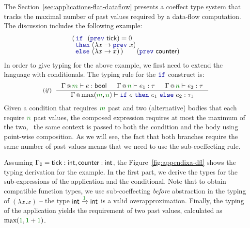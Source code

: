 The Section~\ref{sec:applications-flat-dataflow} presents a coeffect type system that tracks the 
maximal number of past values required by a data-flow computation. The discussion includes the 
following example:
%
\begin{equation*}
\begin{array}{l}
(\,   \kvd{if}~~(\kvd{prev}~\ident{tick})=0\\[-0.25em]
\,\,\, \kvd{then}~(\lambda x \rightarrow \kvd{prev}~x)\\[-0.25em]
\,\,\, \kvd{else}~(\lambda x \rightarrow x) \,)\qquad(\kvd{prev}~\ident{counter})
\end{array}
\end{equation*}
%
In order to give typing for the above example, we first need to extend the language with 
conditionals. The typing rule for the $\kvd{if}$ construct is:
%
\begin{equation*}
\tyrule{if}
  { \coctx{\Gamma}{\cclrd{m}} \vdash e : \ident{bool} &
    \coctx{\Gamma}{\cclrd{n}} \vdash e_1 : \tau &
    \coctx{\Gamma}{\cclrd{n}} \vdash e_2 : \tau }
  {\coctx{\Gamma}{\textnormal{max}(\cclrd{m},\cclrd{n})} \vdash \kvd{if}~e~\kvd{then}~e_1~\kvd{else}~e_2 : \tau_1 }
\end{equation*}
%
Given a condition that requires $\cclrd{m}$ past and two (alternative) bodies that each require
$\cclrd{n}$ past values, the composed expression requires at most the maximum of the two, \ie~the
same context is passed to both the condition and the body using point-wise composition. As we will
see, the fact that both branches require the same number of past values means that we need to use
the sub-coeffecting rule.

Assuming $\Gamma_0 = \ident{tick}:\ident{int}, \ident{counter}:\ident{int}$, the 
Figure~\ref{fig:appendixa-dfl} shows the typing derivation for the example. In the first part,
we derive the types for the sub-expressions of the application and the conditional. Note that 
to obtain compatible function types, we use sub-coeffecting \emph{before} abstraction in the
typing of $(\lambda x.x)$ -- the type $\ident{int} \xrightarrow{\cclrd{1}} \ident{int}$ is  a
valid overapproximation. Finally, the typing of the application yields the requirement of two 
past values, calculated as $\textnormal{max}(\cclrd{1}, \cclrd{1}+\cclrd{1})$.

\newpage

